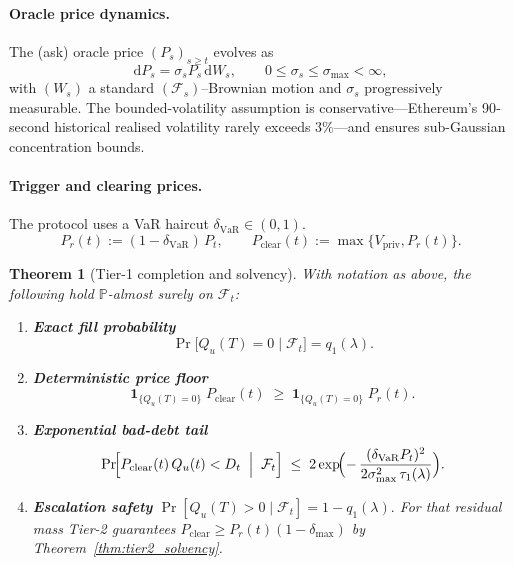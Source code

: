 \documentclass[11pt]{article}
\newtheorem{theorem}{Theorem}[section]
\begin{document}
\paragraph{Oracle price dynamics.}
The (ask) oracle price $(P_s)_{s\ge t}$ evolves as
\[
   \mathrm dP_s
      = \sigma_s P_s \,\mathrm dW_s,
   \qquad
   0\le\sigma_s\le\sigma_{\max}<\infty,
\]
with $(W_s)$ a standard $(\mathcal F_s)$–Brownian motion and
$\sigma_s$ progressively measurable.  The bounded-volatility
assumption is conservative—Ethereum’s 90‐second historical realised
volatility rarely exceeds $3\%$—and ensures sub-Gaussian concentration
bounds.

\paragraph{Trigger and clearing prices.}
The protocol uses a VaR haircut $\delta_{\mathrm{VaR}}\in(0,1)$.
\[
   P_r(t)
      := (1-\delta_{\mathrm{VaR}})\,P_t,
   \qquad
   P_{\mathrm{clear}}(t)
      := \max\{V_{\mathrm{priv}}, P_r(t)\}.
\]

\begin{theorem}[Tier-1 completion and solvency]
\label{thm:tier1-completion}
With notation as above, the following hold $\mathbb P$-almost surely
on $\mathcal F_t$:

\begin{enumerate}
\item[(i)] \textbf{Exact fill probability}
      \[
         \Pr\bigl[Q_u(T)=0\mid\mathcal F_t\bigr] = q_1(\lambda).
      \]

\item[(ii)] \textbf{Deterministic price floor}
      \[
         \mathbf 1_{\{Q_u(T)=0\}}
            \;P_{\mathrm{clear}}(t)
         \;\ge\;
         \mathbf 1_{\{Q_u(T)=0\}}
            \;P_r(t).
      \]

\item[(iii)] \textbf{Exponential bad-debt tail}
      \[
         \Pr\!\Bigl[
             P_{\mathrm{clear}}(t)\,Q_u(t)<D_t
             \;\Bigm|\;\mathcal F_t
         \Bigr]
         \;\le\;
         2\exp\!\Bigl(
            -\,\frac{(\delta_{\mathrm{VaR}}P_t)^2}
                    {2\sigma_{\max}^2\,\tau_1(\lambda)}
         \Bigr).
      \]

\item[(iv)] \textbf{Escalation safety}
      \(
         \Pr[Q_u(T)>0\mid\mathcal F_t] = 1-q_1(\lambda).
      \)
      For that residual mass Tier-2 guarantees
      \(
        P_{\mathrm{clear}}\ge P_r(t)(1-\delta_{\max})
      \)
      by Theorem~\ref{thm:tier2_solvency}.
\end{enumerate}
\end{theorem}
\end{document}

